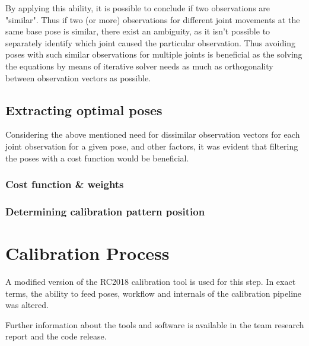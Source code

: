 \documentclass[english, printversion, nomenclature, notitle]{tuvisionthesis} %
\begin{document}
By applying this ability, it is possible to conclude if two observations are "similar". Thus if two (or more) observations for different joint movements at the same base pose is similar, there exist an ambiguity, as it isn't possible to separately identify which joint caused the particular observation. Thus avoiding poses with such similar observations for multiple joints is beneficial as the solving the equations by means of iterative solver needs as much as orthogonality between observation vectors as possible.

\subsection{Extracting optimal poses}

Considering the above mentioned need for dissimilar observation vectors for each joint observation for a given pose, and other factors, it was evident that filtering the poses with a cost function would be beneficial.

\subsubsection{Cost function \& weights}


\subsubsection{Determining calibration pattern position}

\section{Calibration Process}
A modified version of the RC2018 calibration tool is used for this step. In exact terms, the ability to feed poses, workflow and internals of the calibration pipeline was altered.

Further information about the tools and software is available in the team research report and the code release. 

\end{document}
